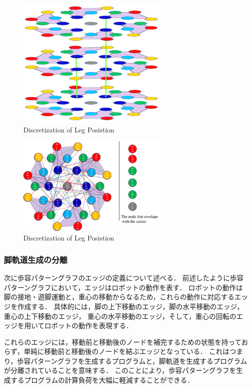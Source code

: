 \begin{figure}[htbp]
  \begin{center}
    \includegraphics[width=75mm, clip]{figure/chapter2/hierarchy.png}
   \caption{Discretization of Leg Posistion}
   \label{fig:discretization}
  \end{center}
\end{figure}

\begin{figure}[htbp]
  \begin{center}
    \includegraphics[width=75mm, clip]{figure/chapter2/hierarchy2.png}
   \caption{Discretization of Leg Posistion}
   \label{fig:discretization}
  \end{center}
\end{figure}

\subsubsection{脚軌道生成の分離}
次に歩容パターングラフのエッジの定義について述べる．
前述したように歩容パターングラフにおいて，エッジはロボットの動作を表す．
ロボットの動作は脚の接地・遊脚運動と，重心の移動からなるため，これらの動作に対応するエッジを作成する．
具体的には，脚の上下移動のエッジ，脚の水平移動のエッジ，重心の上下移動のエッジ，
重心の水平移動のエッジ，そして，重心の回転のエッジを用いてロボットの動作を表現する．

これらのエッジには，移動前と移動後のノードを補完するための状態を持っておらず，単純に移動前と移動後のノードを結ぶエッジとなっている．
これはつまり，歩容パターングラフを生成するプログラムと，脚軌道を生成するプログラムが分離されていることを意味する．
このことにより，歩容パターングラフを生成するプログラムの計算負荷を大幅に軽減することができる．

